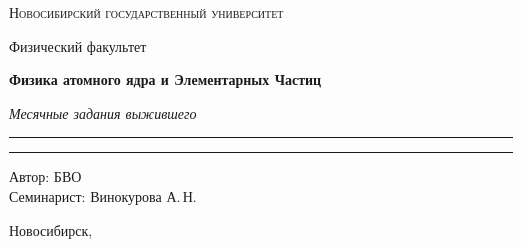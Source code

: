 \documentclass[12pt,a4paper]{report}
\begin{document}
\begin{titlepage}
    \thispagestyle{empty}

    \begin{center}
        \vspace*{1.5cm}

        {\Large\scshape Новосибирский государственный университет\par}
        \vspace{0.25cm}
        {\large Физический факультет\par}

        \vfill

        {\Huge\bfseries Физика атомного ядра и Элементарных Частиц\par}

        \vspace{0.45cm}

        {\Large\itshape Месячные задания выжившего\par}

        \vspace{0.8cm}

        \rule{0.72\linewidth}{0 pt}



        \rule{2\linewidth}{0pt}

        \vfill

        \begin{flushright}
            \large
            Автор: БВО\\[0.25cm]
            Семинарист: Винокурова А.\,Н.
        \end{flushright}

        \vspace{1.2cm}

        {\large Новосибирск, \the\year}

    \end{center}
\end{titlepage}

\tableofcontents
\newpage



\clearpage
\end{document}
